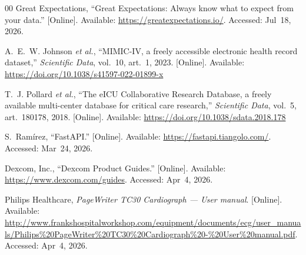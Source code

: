 \documentclass[conference]{IEEEtran}
\begin{document}
\begin{thebibliography}{00}
{Great Expectations}, ``Great Expectations: Always know what to expect from your data.'' [Online]. Available: \url{https://greatexpectations.io/}. Accessed: Jul~18, 2026.

A.~E.~W. Johnson \emph{et al.}, ``MIMIC-IV, a freely accessible electronic health record dataset,'' \emph{Scientific Data}, vol.~10, art.~1, 2023. [Online]. Available: \url{https://doi.org/10.1038/s41597-022-01899-x}

T.~J. Pollard \emph{et al.}, ``The eICU Collaborative Research Database, a freely available multi-center database for critical care research,'' \emph{Scientific Data}, vol.~5, art.~180178, 2018. [Online]. Available: \url{https://doi.org/10.1038/sdata.2018.178}

S.~Ram\'irez, ``FastAPI.'' [Online]. Available: \url{https://fastapi.tiangolo.com/}. Accessed: Mar~24, 2026.

{Dexcom, Inc.}, ``Dexcom Product Guides.'' [Online]. Available: \url{https://www.dexcom.com/guides}. Accessed: Apr~4, 2026.

{Philips Healthcare}, \emph{PageWriter TC30 Cardiograph --- User manual}. [Online]. Available: \url{http://www.frankshospitalworkshop.com/equipment/documents/ecg/user_manuals/Philips\%20PageWriter\%20TC30\%20Cardiograph\%20-\%20User\%20manual.pdf}. Accessed: Apr~4, 2026.

\end{thebibliography}
\end{document}
